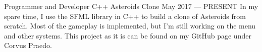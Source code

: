 \begin{cventries}
  \cventry%
    {Programmer and Developer}
    {C++ Asteroids Clone}
    {}
    {May 2017 --- PRESENT}
    {%
      In my spare time, I use the SFML library in C++ to build a clone of
      Asteroids from scratch.  Most of the gameplay is implemented, but I'm
      still working on the menu and other systems. This project as it is can be
      found on my GitHub page under Corvus Praedo.
    }
\end{cventries}
